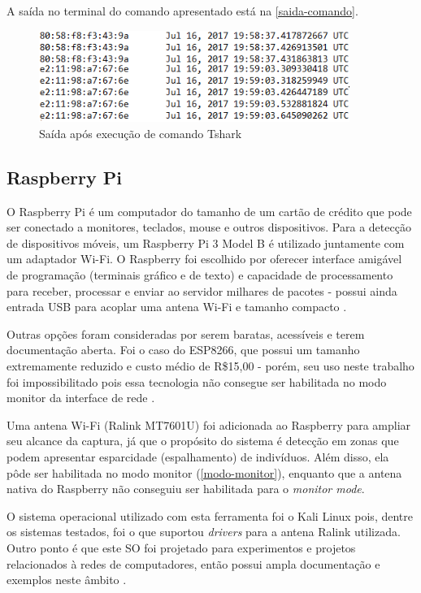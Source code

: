 A saída no terminal do comando apresentado está na \autoref{saida-comando}.

\begin{figure}[htb]
  \caption{\label{saida-comando}Saída após execução de comando Tshark}
  \begin{center}
    \includegraphics[width=0.90\textwidth]{img/packets.png}
  \end{center}
\end{figure}

\subsection{Raspberry Pi}
O Raspberry Pi é um computador do tamanho de um cartão de crédito que pode ser conectado a monitores, teclados, mouse e outros dispositivos.
Para a detecção de dispositivos móveis, um Raspberry Pi 3 Model B é utilizado juntamente com um adaptador Wi-Fi. O Raspberry foi escolhido por oferecer interface amigável de programação (terminais gráfico e de texto) e capacidade de processamento para receber, processar e enviar ao servidor milhares de pacotes - possui ainda entrada USB para acoplar uma antena Wi-Fi e tamanho compacto \cite{rpi2017}.

Outras opções foram consideradas por serem baratas, acessíveis e terem documentação aberta. Foi o caso do ESP8266, que possui um tamanho extremamente reduzido e custo médio de R\$15,00 \cite{Embarcados2015} - porém, seu uso neste trabalho foi impossibilitado pois essa tecnologia não consegue ser habilitada no modo monitor da interface de rede \cite{Puhl2016} \cite{Ferreira2016}.

Uma antena Wi-Fi (Ralink MT7601U) foi adicionada ao Raspberry para ampliar seu alcance da captura, já que o propósito do sistema é detecção em zonas que podem
apresentar esparcidade (espalhamento) de indivíduos. Além disso, ela pôde ser habilitada no modo monitor (\autoref{modo-monitor}), enquanto que a antena nativa
do Raspberry não conseguiu ser habilitada para o \emph{monitor mode}.

O sistema operacional utilizado com esta ferramenta foi o Kali Linux pois,
dentre os sistemas testados, foi o que suportou \emph{drivers} para a antena
Ralink utilizada. Outro ponto é que este SO foi projetado para experimentos e
projetos relacionados à redes de computadores, então possui ampla documentação e exemplos neste âmbito
\cite{kali}.

